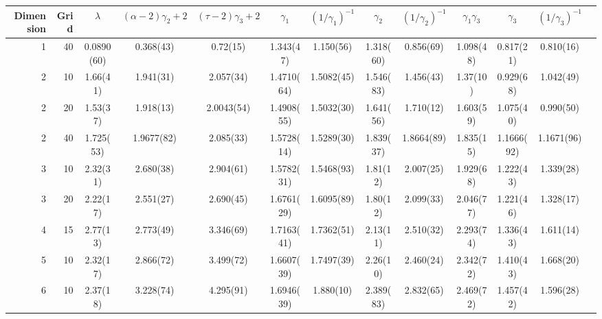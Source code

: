 \begin{tabular}{rr|ccccccccccc}
\toprule
Dimension & Grid & $\lambda$ & $(\alpha - 2)\gamma_2 + 2$ & $(\tau - 2)\gamma_3 + 2$ & $\gamma_1$ & $(1/\gamma_1)^{-1}$ & $\gamma_2$ & $(1/\gamma_2)^{-1}$ & $\gamma_1 \gamma_3$ & $\gamma_3$ & $(1/\gamma_3)^{-1}$ \\
\midrule
1 & 40 & 0.0890(60) & 0.368(43) & 0.72(15) & 1.343(47) & 1.150(56) & 1.318(60) & 0.856(69) & 1.098(48) & 0.817(21) & 0.810(16) \\
2 & 10 & 1.66(41) & 1.941(31) & 2.057(34) & 1.4710(64) & 1.5082(45) & 1.546(83) & 1.456(43) & 1.37(10) & 0.929(68) & 1.042(49) \\
2 & 20 & 1.53(37) & 1.918(13) & 2.0043(54) & 1.4908(55) & 1.5032(30) & 1.641(56) & 1.710(12) & 1.603(59) & 1.075(40) & 0.990(50) \\
2 & 40 & 1.725(53) & 1.9677(82) & 2.085(33) & 1.5728(14) & 1.5289(30) & 1.839(37) & 1.8664(89) & 1.835(15) & 1.1666(92) & 1.1671(96) \\
3 & 10 & 2.32(31) & 2.680(38) & 2.904(61) & 1.5782(31) & 1.5468(93) & 1.81(12) & 2.007(25) & 1.929(68) & 1.222(43) & 1.339(28) \\
3 & 20 & 2.22(17) & 2.551(27) & 2.690(45) & 1.6761(29) & 1.6095(89) & 1.80(12) & 2.099(33) & 2.046(77) & 1.221(46) & 1.328(17) \\
4 & 15 & 2.77(13) & 2.773(49) & 3.346(69) & 1.7163(41) & 1.7362(51) & 2.13(11) & 2.510(32) & 2.293(74) & 1.336(43) & 1.611(14) \\
5 & 10 & 2.32(17) & 2.866(72) & 3.499(72) & 1.6607(39) & 1.7497(39) & 2.26(10) & 2.460(24) & 2.342(72) & 1.410(43) & 1.668(20) \\
6 & 10 & 2.37(18) & 3.228(74) & 4.295(91) & 1.6946(39) & 1.880(10) & 2.389(83) & 2.832(65) & 2.469(72) & 1.457(42) & 1.596(28) \\
\bottomrule
\end{tabular}
